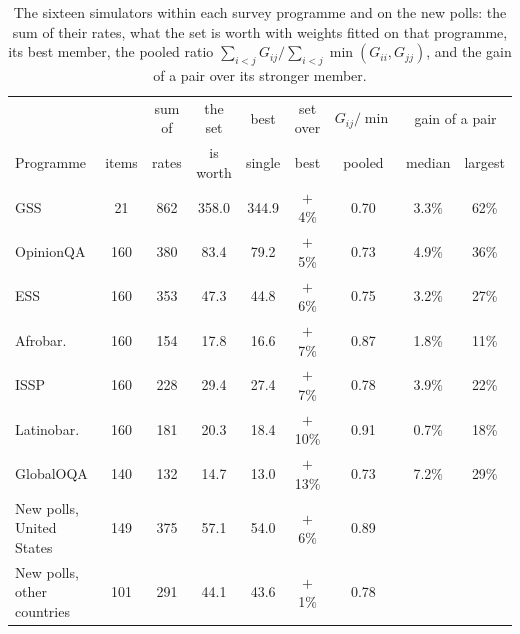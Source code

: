 \begin{table}[h]
\centering\small
\setlength{\tabcolsep}{5pt}
\begin{tabular}{lcccccccc}
\toprule
 & & sum of & the set & best & set over & $G_{ij}/\min$ & \multicolumn{2}{c}{gain of a pair} \\
Programme & items & rates & is worth & single & best & pooled & median & largest \\
\midrule
GSS & 21 & 862 & 358.0 & 344.9 & $+$4\% & 0.70 & 3.3\% & 62\% \\
OpinionQA & 160 & 380 & 83.4 & 79.2 & $+$5\% & 0.73 & 4.9\% & 36\% \\
ESS & 160 & 353 & 47.3 & 44.8 & $+$6\% & 0.75 & 3.2\% & 27\% \\
Afrobar. & 160 & 154 & 17.8 & 16.6 & $+$7\% & 0.87 & 1.8\% & 11\% \\
ISSP & 160 & 228 & 29.4 & 27.4 & $+$7\% & 0.78 & 3.9\% & 22\% \\
Latinobar. & 160 & 181 & 20.3 & 18.4 & $+$10\% & 0.91 & 0.7\% & 18\% \\
GlobalOQA & 140 & 132 & 14.7 & 13.0 & $+$13\% & 0.73 & 7.2\% & 29\% \\
New polls, United States & 149 & 375 & 57.1 & 54.0 & $+$6\% & 0.89 & & \\
New polls, other countries & 101 & 291 & 44.1 & 43.6 & $+$1\% & 0.78 & & \\
\bottomrule
\end{tabular}
\caption{The sixteen simulators within each survey programme and on the new polls: the sum of their rates, what the set is worth with weights fitted on that programme, its best member, the pooled ratio $\sum_{i<j}G_{ij}/\sum_{i<j}\min(G_{ii},G_{jj})$, and the gain of a pair over its stronger member.}
\label{tab:bypro}
\end{table}
